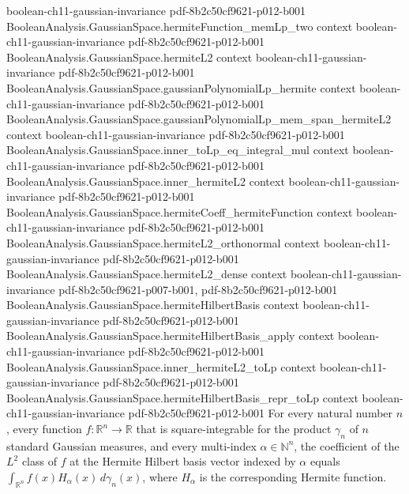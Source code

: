 \begin{theorem}
  {boolean-ch11-gaussian-invariance}
  {pdf-8b2c50cf9621-p012-b001}
\proofstep
  {BooleanAnalysis.GaussianSpace.hermiteFunction_memLp_two}
  {context}
  {boolean-ch11-gaussian-invariance}
  {pdf-8b2c50cf9621-p012-b001}
\proofstep
  {BooleanAnalysis.GaussianSpace.hermiteL2}
  {context}
  {boolean-ch11-gaussian-invariance}
  {pdf-8b2c50cf9621-p012-b001}
\proofstep
  {BooleanAnalysis.GaussianSpace.gaussianPolynomialLp_hermite}
  {context}
  {boolean-ch11-gaussian-invariance}
  {pdf-8b2c50cf9621-p012-b001}
\proofstep
  {BooleanAnalysis.GaussianSpace.gaussianPolynomialLp_mem_span_hermiteL2}
  {context}
  {boolean-ch11-gaussian-invariance}
  {pdf-8b2c50cf9621-p012-b001}
\proofstep
  {BooleanAnalysis.GaussianSpace.inner_toLp_eq_integral_mul}
  {context}
  {boolean-ch11-gaussian-invariance}
  {pdf-8b2c50cf9621-p012-b001}
\proofstep
  {BooleanAnalysis.GaussianSpace.inner_hermiteL2}
  {context}
  {boolean-ch11-gaussian-invariance}
  {pdf-8b2c50cf9621-p012-b001}
\proofstep
  {BooleanAnalysis.GaussianSpace.hermiteCoeff_hermiteFunction}
  {context}
  {boolean-ch11-gaussian-invariance}
  {pdf-8b2c50cf9621-p012-b001}
\proofstep
  {BooleanAnalysis.GaussianSpace.hermiteL2_orthonormal}
  {context}
  {boolean-ch11-gaussian-invariance}
  {pdf-8b2c50cf9621-p012-b001}
\proofstep
  {BooleanAnalysis.GaussianSpace.hermiteL2_dense}
  {context}
  {boolean-ch11-gaussian-invariance}
  {pdf-8b2c50cf9621-p007-b001,
    pdf-8b2c50cf9621-p012-b001}
\proofstep
  {BooleanAnalysis.GaussianSpace.hermiteHilbertBasis}
  {context}
  {boolean-ch11-gaussian-invariance}
  {pdf-8b2c50cf9621-p012-b001}
\proofstep
  {BooleanAnalysis.GaussianSpace.hermiteHilbertBasis_apply}
  {context}
  {boolean-ch11-gaussian-invariance}
  {pdf-8b2c50cf9621-p012-b001}
\proofstep
  {BooleanAnalysis.GaussianSpace.inner_hermiteL2_toLp}
  {context}
  {boolean-ch11-gaussian-invariance}
  {pdf-8b2c50cf9621-p012-b001}
\proofstep
  {BooleanAnalysis.GaussianSpace.hermiteHilbertBasis_repr_toLp}
  {context}
  {boolean-ch11-gaussian-invariance}
  {pdf-8b2c50cf9621-p012-b001}
For every natural number $n$, every function $f:\mathbb R^n\to\mathbb R$ that is square-integrable for the product $\gamma_n$ of $n$ standard Gaussian measures, and every multi-index $\alpha\in\mathbb N^n$, the coefficient of the $L^2$ class of $f$ at the Hermite Hilbert basis vector indexed by $\alpha$ equals $\int_{\mathbb R^n} f(x)H_\alpha(x)\,d\gamma_n(x)$, where $H_\alpha$ is the corresponding Hermite function.
\end{theorem}

